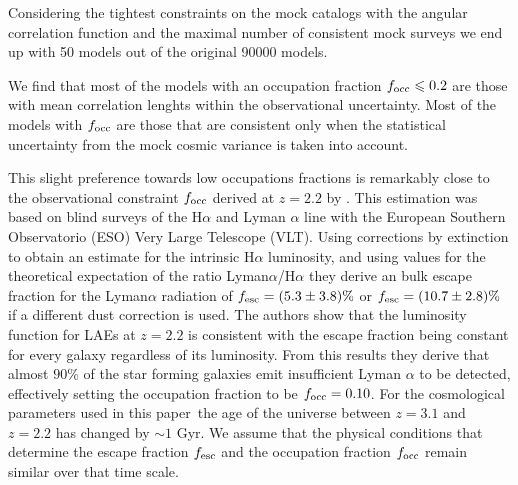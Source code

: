 \documentclass[usenatbib]{mn2e}
\newcommand{\documentname}{paper~}
\begin{document}


Considering the tightest constraints on the mock catalogs 
with the angular correlation function and the maximal
number of consistent mock surveys we end up with 50 models out of the
original 90000 models. 

We find that most of the models with an occupation fraction $f_{\rm
  occ}\leq 0.2$ are those with mean correlation lenghts within the
observational uncertainty. Most of the models with $f_{\rm occ}$ are
those that are consistent only when the statistical uncertainty from
the mock cosmic variance is taken into account. 

This slight preference towards low occupations fractions is remarkably
close to  the observational constraint $f_{\rm occ}$ derived at
$z=2.2$ by \cite{Hayes2010}.  This estimation was based
on blind surveys of the H$\alpha$ and Lyman $\alpha$ line with the
European Southern  Observatorio (ESO) Very Large Telescope
(VLT). Using corrections by extinction to obtain an estimate for the
intrinsic H$\alpha$ luminosity, and using values for the theoretical
expectation of the ratio Lyman$\alpha$/H$\alpha$ they derive an bulk escape fraction for
the Lyman$\alpha$ radiation of $f_{\rm esc}=(5.3\pm 3.8)\%$ or $f_{\rm
esc}=(10.7\pm 2.8)\%$ if a different dust correction is used. The
authors show that the luminosity function for LAEs at $z=2.2$ is
consistent with the escape fraction being constant for every galaxy
regardless of its luminosity. From this results they derive that
almost $90\%$ of the star forming galaxies emit insufficient
Lyman $\alpha$ to be detected, effectively setting the occupation
fraction to be $f_{\rm occ}=0.10$. For the cosmological parameters
used in this \documentname the age of the universe between $z=3.1$ and
$z=2.2$ has changed by $\sim 1$ Gyr. We assume that the physical
conditions that determine the escape fraction $f_{\rm esc}$ and the
occupation fraction $f_{\rm  occ}$ remain similar over that time
scale.
\end{document}
